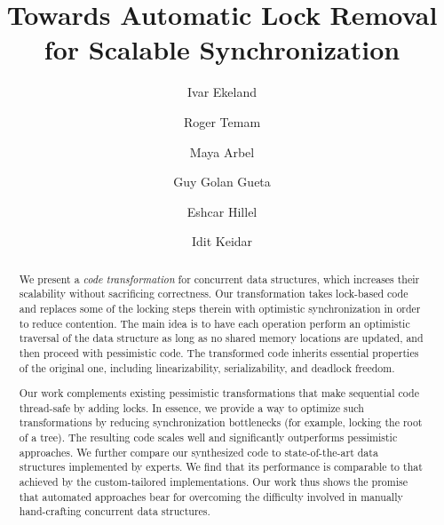 \documentclass[oribibl]{llncs}
\begin{document}
\title{Towards Automatic Lock Removal\\ for Scalable Synchronization}

\author{Ivar Ekeland \and Roger Temam}
\author{
Maya Arbel\fnmsep{}
\and Guy Golan Gueta  
\and Eshcar Hillel  
\and Idit Keidar\fnmsep{}} 



\maketitle

\begin{abstract}
We present a \emph{code transformation} for concurrent data structures,
which increases their scalability without sacrificing correctness.
Our transformation takes lock-based code and replaces some of the
locking steps therein with optimistic synchronization in order to reduce contention. The main idea is to
have each operation perform an optimistic traversal of the data structure
as long as no shared memory locations are updated, and then proceed with
pessimistic code. The transformed code inherits essential
properties of the original one, including linearizability, serializability,
and deadlock freedom.

Our work complements existing pessimistic transformations that make
sequential code thread-safe by adding locks.
In essence, we provide a way to optimize such transformations by reducing
synchronization bottlenecks (for example, locking the root of a tree).
The resulting code scales well and significantly outperforms
pessimistic approaches. We further compare our synthesized code to state-of-the-art
data structures implemented by experts.
We find that its performance is comparable %
to that achieved by the custom-tailored implementations.
Our work thus shows the promise that automated approaches
bear for overcoming the difficulty involved in manually
hand-crafting concurrent data structures.

\end{abstract}



\thispagestyle{empty}





%










%

\appendix

%
\end{document}
